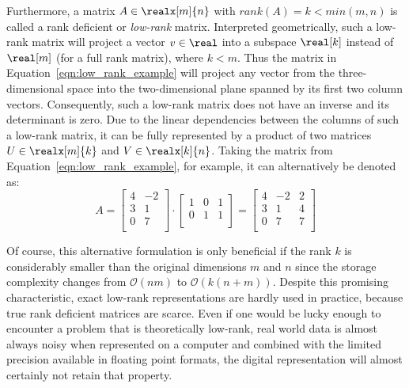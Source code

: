 Furthermore, a matrix $A \in \realx[m]{n}$ with $rank(A)=k < min(m,n)$ is called a rank deficient or \textit{low-rank} matrix. Interpreted geometrically, such a low-rank matrix will project a vector $v \in \real$ into a subspace $\real[k]$ instead of $\real[m]$ (for a full rank matrix), where $k<m$. Thus the matrix in Equation~\hyperref[eqn:low_rank_example]{\ref{eqn:low_rank_example}} will project any vector from the three-dimensional space into the two-dimensional plane spanned by its first two column vectors. Consequently, such a low-rank matrix does not have an inverse and its determinant is zero. Due to the linear dependencies between the columns of such a low-rank matrix, it can be fully represented by a product of two matrices $U \in \realx[m]{k}$ and $V \in \realx[k]{n}$. Taking the matrix from Equation~\hyperref[eqn:low_rank_example]{\ref{eqn:low_rank_example}}, for example, it can alternatively be denoted as:
\begin{equation}
\label{eqn:low_rank_example}
 A= \left[
    \begin{array}{cc}
      4 & -2  \\
      3 & 1   \\
      0 & 7   \\
    \end{array}
  \right] \cdot
  \left[
    \begin{array}{ccc}
      1 & 0 & 1 \\
      0 & 1 & 1  \\
    \end{array}
  \right]
 =
 \left[
    \begin{array}{ccc}
      4 & -2 & 2 \\
      3 & 1 & 4  \\
      0 & 7 & 7  \\
    \end{array}
  \right]
\end{equation}

\noindent Of course, this alternative formulation is only beneficial if the rank $k$ is considerably smaller than the original dimensions $m$ and $n$ since the storage complexity changes from $\mathcal{O}(nm)$ to $\mathcal{O}(k(n+m))$. Despite this promising characteristic, exact low-rank representations are hardly used in practice, because true rank deficient matrices are scarce. Even if one would be lucky enough to encounter a problem that is theoretically low-rank, real world data is almost always noisy when represented on a computer and combined with the limited precision available in floating point formats, the digital representation will almost certainly not retain that property. 

